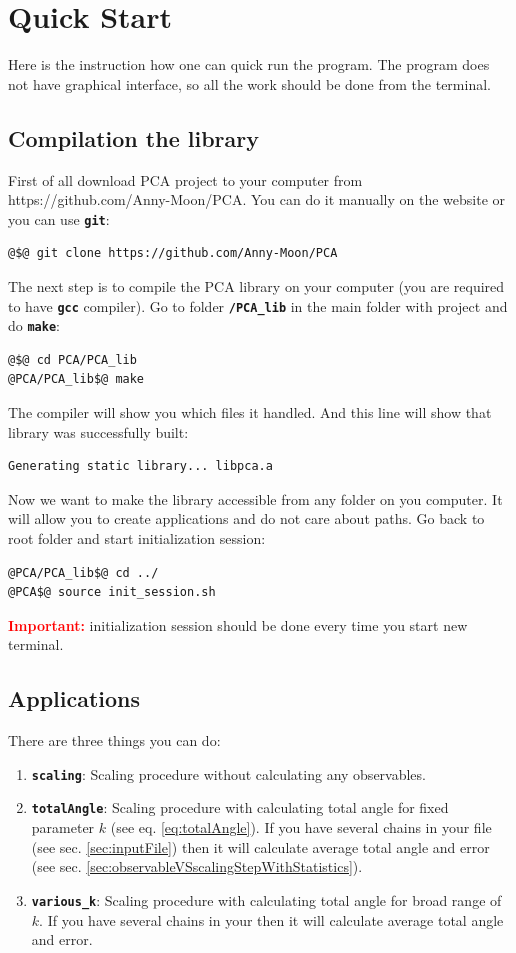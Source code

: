 \documentclass[12pt]{article}
\newcommand{\comp}[1]{\textbf{\texttt {#1}}}%
\newcommand{\important}{\textcolor{Red}{\textbf{Important: }}}
\newcommand{\enterProblemHeader}[1]{
\nobreak\extramarks{#1}{}\nobreak
}
\newcommand{\exitProblemHeader}[1]{
}
\newcounter{homeworkProblemCounter} %
\newcommand{\homeworkProblemName}{}
\newenvironment{homeworkProblem}[1][Problem \arabic{homeworkProblemCounter}]{ %
\stepcounter{homeworkProblemCounter} %
\renewcommand{\homeworkProblemName}{#1} %
\section{\homeworkProblemName} %
\setlength\parindent{18pt}
\enterProblemHeader{\homeworkProblemName} %
}{
}
\begin{document}
\begin{homeworkProblem}[Quick Start]\label{sec:classPolymer}
Here is the instruction how one can quick run the program. The program does not have graphical interface, so all the work should be done from the terminal.
\subsection{Compilation the library}
First of all download PCA project to your computer from https://github.com/Anny-Moon/PCA. You can do it manually on the website or you can use \comp{git}:
\begin{lstlisting}
@$@ git clone https://github.com/Anny-Moon/PCA
\end{lstlisting}
The next step is to compile the PCA library on your computer (you are required to have \comp{gcc} compiler). Go to folder \comp{/PCA\_lib} in the main folder with project and do \comp{make}:
\begin{lstlisting}
@$@ cd PCA/PCA_lib
@PCA/PCA_lib$@ make
\end{lstlisting}
The compiler will show you which files it handled. And this line will show that library was successfully built:
\begin{lstlisting}
Generating static library... libpca.a
\end{lstlisting}
Now we want to make the library accessible from any folder on you computer. It will allow you to create applications and do not care about paths. Go back to root folder and start initialization session:
\begin{lstlisting}
@PCA/PCA_lib$@ cd ../
@PCA$@ source init_session.sh
\end{lstlisting}
\important initialization session should be done every time you start new terminal.


\subsection{Applications}
There are three things you can do:
\begin{enumerate}
\item \comp{scaling}: Scaling procedure without calculating any observables.
\item \comp{totalAngle}: Scaling procedure with calculating total angle for fixed parameter $k$ (see eq. \ref{eq:totalAngle}). If you have several chains in your file (see sec. \ref{sec:inputFile}) then it will calculate average total angle and error (see sec. \ref{sec:observableVSscalingStepWithStatistics}).
\item \comp{various\_k}: Scaling procedure with calculating total angle for broad range of $k$. If you have several chains in your  then it will calculate average total angle and error.
\end{enumerate}


\end{homeworkProblem}
\end{document}
